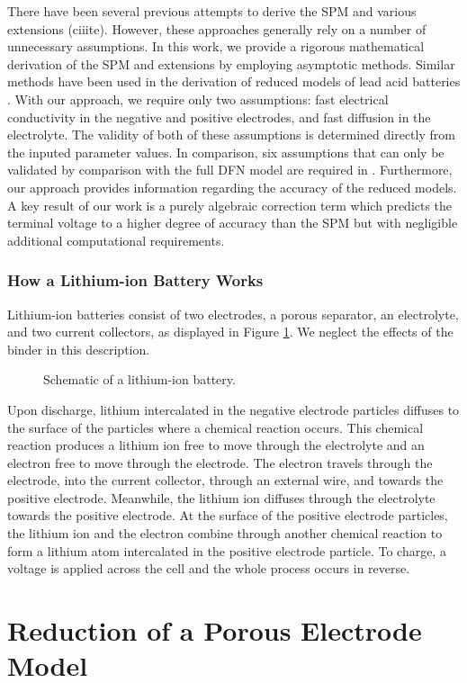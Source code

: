 \documentclass[preprint]{elsarticle}
\begin{document}
There have been several previous attempts to derive the SPM and various extensions (ciiite). However, these approaches generally rely on a number of unnecessary assumptions. In this work, we provide a rigorous mathematical derivation of the SPM and extensions by employing asymptotic methods. Similar methods have been used in the derivation of reduced models of lead acid batteries \cite{tino}. With our approach, we require only two assumptions: fast electrical conductivity in the negative and positive electrodes, and fast diffusion in the electrolyte. The validity of both of these assumptions is determined directly from the inputed parameter values. In comparison, six assumptions that can only be validated by comparison with the full DFN model are required in \cite{Moura2017}. Furthermore, our approach provides information regarding the accuracy of the reduced models. A key result of our work is a purely algebraic correction term which predicts the terminal voltage to a higher degree of accuracy than the SPM but with negligible additional computational requirements. 

\subsection{How a Lithium-ion Battery Works}
Lithium-ion batteries consist of two electrodes, a porous separator, an electrolyte, and two current collectors, as displayed in Figure \ref{fig:liBat}. We neglect the effects of the binder in this description. 
\begin{figure}[h!]
	\centering
	\LiBattery
    \caption{Schematic of a lithium-ion battery.}\label{fig:liBat}
\end{figure} 
Upon discharge, lithium intercalated in the negative electrode particles diffuses to the surface of the particles where a chemical reaction occurs. This chemical reaction produces a lithium ion free to move through the electrolyte and an electron free to move through the electrode. The electron travels through the electrode, into the current collector, through an external wire, and towards the positive electrode. Meanwhile, the lithium ion diffuses through the electrolyte towards the positive electrode. At the surface of the positive electrode particles, the lithium ion and the electron combine through another chemical reaction to form a lithium atom intercalated in the positive electrode particle. To charge, a voltage is applied across the cell and the whole process occurs in reverse.

\chapter{Reduction of a Porous Electrode Model}\label{chap:reduction} 
\end{document}
